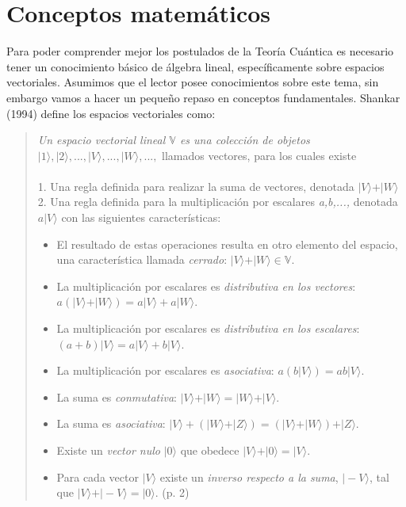 \documentclass[11pt,a4paper]{article}
\begin{document}
\section*{Conceptos matemáticos}
Para poder comprender mejor los postulados de la Teoría Cuántica es necesario tener un conocimiento básico de álgebra lineal, específicamente sobre espacios vectoriales. Asumimos que el lector posee conocimientos sobre este tema, sin embargo vamos a hacer un pequeño repaso en conceptos fundamentales. 
Shankar (1994) define los espacios vectoriales como:

\begin{quote}
\textit{Un espacio vectorial lineal $\mathbb{V}$ es una colección de objetos} $\vert1\rangle,\vert2\rangle,...,\vert V\rangle,...,\vert W\rangle,...,$ llamados vectores, para los cuales existe
\\\\
1. Una regla definida para realizar la suma de vectores, denotada $\vert V\rangle+\vert W\rangle$
\\2. Una regla definida para la multiplicación por escalares \textit{a,b,...,} denotada $a\vert V\rangle$ con las siguientes características:
\\
\begin{itemize}
\item El resultado de estas operaciones resulta en otro elemento del espacio, una característica llamada \textit{cerrado}: $\vert V\rangle+ \vert W\rangle\in\mathbb{V}$.
\item La multiplicación por escalares es \textit{distributiva en los vectores}: $a(\vert V\rangle+\vert W\rangle)=a\vert V\rangle+a\vert W\rangle$.
\item La multiplicación por escalares es \textit{distributiva en los escalares}: $(a+b)\vert V\rangle=a\vert V\rangle+b\vert V\rangle$.
\item La multiplicación por escalares es \textit{asociativa}: $a(b\vert V\rangle)=ab\vert V\rangle$.
\item La suma es \textit{conmutativa}: $\vert V\rangle+\vert W\rangle=\vert W\rangle+\vert V\rangle$.
\item La suma es \textit{asociativa}: $\vert V\rangle+(\vert W\rangle+\vert Z\rangle)=(\vert V\rangle+\vert W\rangle)+\vert Z\rangle$.
\item Existe un \textit{vector nulo} $\vert 0\rangle$ que obedece $\vert V\rangle+\vert 0\rangle=\vert V\rangle$.
\item Para cada vector $\vert V\rangle$ existe un \textit{inverso respecto a la suma}, $\vert -V\rangle$, tal que $\vert V\rangle+\vert -V\rangle=\vert 0\rangle$. (p. 2)
\end{itemize}
\end{quote}
\end{document}
